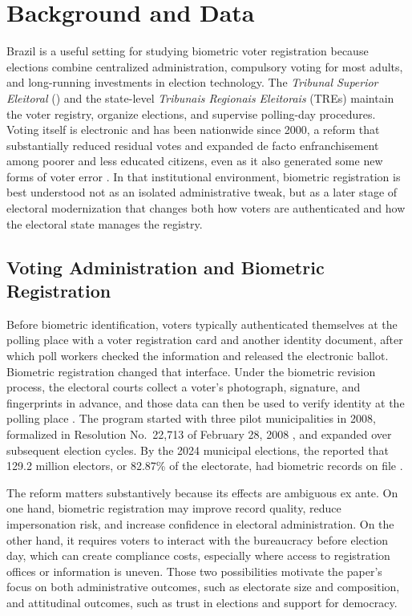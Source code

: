\section{Background and Data}
\label{sec:background-data}
\label{sec:institutional-background}

Brazil is a useful setting for studying biometric voter registration because elections combine centralized administration, compulsory voting for most adults, and long-running investments in election technology. The \textit{Tribunal Superior Eleitoral} (\TSE{}) and the state-level \textit{Tribunais Regionais Eleitorais} (TREs) maintain the voter registry, organize elections, and supervise polling-day procedures. Voting itself is electronic and has been nationwide since 2000, a reform that substantially reduced residual votes and expanded de facto enfranchisement among poorer and less educated citizens, even as it also generated some new forms of voter error \citep{Fujiwara2015VotingTechnoloPolitica, Zucco2016TradingOldErrors}. In that institutional environment, biometric registration is best understood not as an isolated administrative tweak, but as a later stage of electoral modernization that changes both how voters are authenticated and how the electoral state manages the registry.

\subsection{Voting Administration and Biometric Registration}

Before biometric identification, voters typically authenticated themselves at the polling place with a voter registration card and another identity document, after which poll workers checked the information and released the electronic ballot. Biometric registration changed that interface. Under the biometric revision process, the electoral courts collect a voter's photograph, signature, and fingerprints in advance, and those data can then be used to verify identity at the polling place \citep{tse_revisao_eleitoral}. The program started with three pilot municipalities in 2008, formalized in \TSE{} Resolution No.~22,713 of February 28, 2008 \citep{tse_resolucao22713_2008}, and expanded over subsequent election cycles. By the 2024 municipal elections, the \TSE{} reported that 129.2 million electors, or 82.87\% of the electorate, had biometric records on file \citep{tse_biometria2024}.

The reform matters substantively because its effects are ambiguous ex ante. On one hand, biometric registration may improve record quality, reduce impersonation risk, and increase confidence in electoral administration. On the other hand, it requires voters to interact with the bureaucracy before election day, which can create compliance costs, especially where access to registration offices or information is uneven. Those two possibilities motivate the paper's focus on both administrative outcomes, such as electorate size and composition, and attitudinal outcomes, such as trust in elections and support for democracy.

